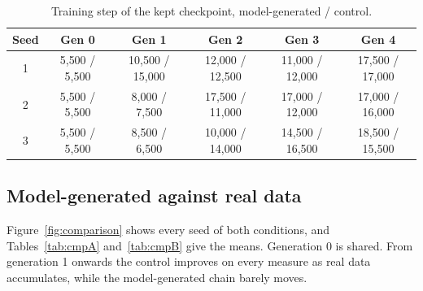 \documentclass[11pt,a4paper]{article}
\begin{document}
\begin{table}[htbp]
\centering
\small
\caption{Training step of the kept checkpoint, model-generated / control.}
\label{tab:selection}
\begin{tabular}{cccccc}
\toprule
Seed & Gen 0 & Gen 1 & Gen 2 & Gen 3 & Gen 4\\
\midrule
1 & 5{,}500 / 5{,}500 & 10{,}500 / 15{,}000 & 12{,}000 / 12{,}500 & 11{,}000 / 12{,}000 & 17{,}500 / 17{,}000 \\
2 & 5{,}500 / 5{,}500 & 8{,}000 / 7{,}500 & 17{,}500 / 11{,}000 & 17{,}000 / 12{,}000 & 17{,}000 / 16{,}000 \\
3 & 5{,}500 / 5{,}500 & 8{,}500 / 6{,}500 & 10{,}000 / 14{,}000 & 14{,}500 / 16{,}500 & 18{,}500 / 15{,}500 \\
\bottomrule
\end{tabular}
\end{table}

\subsection{Model-generated against real data}
Figure~\ref{fig:comparison} shows every seed of both conditions, and
Tables~\ref{tab:cmpA} and~\ref{tab:cmpB} give the means. Generation 0 is
shared. From generation 1 onwards the control improves on every measure as
real data accumulates, while the model-generated chain barely moves.
\end{document}
